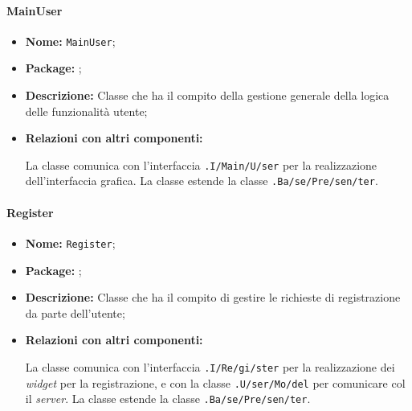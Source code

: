 \paragraph{MainUser}
\begin{flushleft}
\begin{itemize}
\item \textbf{Nome:} \texttt{MainUser};
\item \textbf{Package:} \texttt{\logicUser};
\item \textbf{Descrizione:} Classe che ha il compito della gestione generale della logica delle funzionalità utente;
\item \textbf{Relazioni con altri componenti:}
\begin{sloppypar}
La classe comunica con l'interfaccia \texttt{\viewUser{}.I\fshyp{}Main\fshyp{}U\fshyp{}ser} per la realizzazione dell'interfaccia grafica.
La classe estende la classe \texttt{\logic{}.Ba\fshyp{}se\fshyp{}Pre\fshyp{}sen\fshyp{}ter}.
\end{sloppypar}
\end{itemize}
\end{flushleft}


\paragraph{Register}
\begin{flushleft}
\begin{itemize}
\item \textbf{Nome:} \texttt{Register};
\item \textbf{Package:} \texttt{\logicUser};
\item \textbf{Descrizione:} Classe che ha il compito di gestire le richieste di registrazione da parte dell'utente;
\item \textbf{Relazioni con altri componenti:}
\begin{sloppypar}
La classe comunica con l'interfaccia \texttt{\viewUser{}.I\fshyp{}Re\fshyp{}gi\fshyp{}ster} per la realizzazione dei \textit{widget} per la registrazione, e con la classe \texttt{\model{}.U\fshyp{}ser\fshyp{}Mo\fshyp{}del} per comunicare col il \textit{server}.
La classe estende la classe \texttt{\logic{}.Ba\fshyp{}se\fshyp{}Pre\fshyp{}sen\fshyp{}ter}.\end{sloppypar}
\end{itemize}
\end{flushleft}

